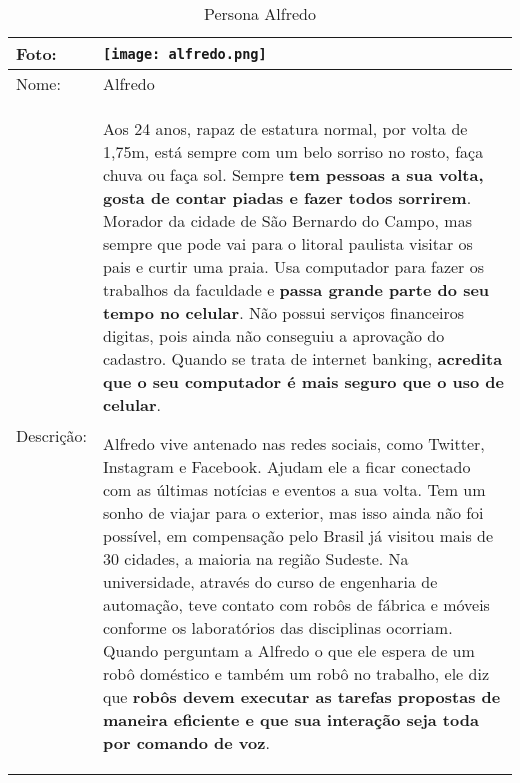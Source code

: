 \begin{table}[!ht]
	\caption{Persona Alfredo}
	\label{tab:alfredo}
	\centering
	\begin{tabular}{ m{2 cm} | m{13cm} }
		\hline
		Foto: & \rule{0cm}{2.7cm} \texttt{[image: alfredo.png]} \\
		\hline
		Nome: & Alfredo \\
		\hline
		Descrição: & Aos 24 anos, rapaz de estatura normal, por volta de 1,75m, está sempre com um belo sorriso no rosto, faça chuva ou faça sol. Sempre \textbf{tem pessoas a sua volta, gosta de contar piadas e fazer todos sorrirem}. Morador da cidade de São Bernardo do Campo, mas sempre que pode vai para o litoral paulista visitar os pais e curtir uma praia. Usa computador para fazer os trabalhos da faculdade e \textbf{passa grande parte do seu tempo no celular}. Não possui serviços financeiros digitas, pois ainda não conseguiu a aprovação do cadastro. Quando se trata de internet banking, \textbf{acredita que o seu computador é mais seguro que o uso de celular}.

		Alfredo vive antenado nas redes sociais, como Twitter, Instagram e Facebook. Ajudam ele a ficar conectado com as últimas notícias e eventos a sua volta. Tem um sonho de viajar para o exterior, mas isso ainda não foi possível, em compensação pelo Brasil já visitou mais de 30 cidades, a maioria na região Sudeste. Na universidade, através do curso de engenharia de automação, teve contato com robôs de fábrica e móveis conforme os laboratórios das disciplinas ocorriam. Quando perguntam a Alfredo o que ele espera de um robô doméstico e também um robô no trabalho, ele diz que \textbf{robôs devem executar as tarefas propostas de maneira eficiente e que sua interação seja toda por comando de voz}.\\
		\hline
	\end{tabular}
\end{table}

